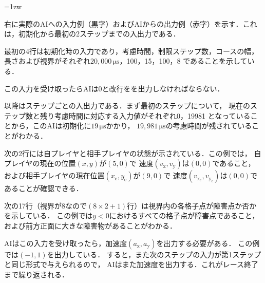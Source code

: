 \documentclass[11pt]{jarticle}
\begin{document}
\begin{minipage}[t]{.6\textwidth}

\parindent=1zw

右に実際のAIへの入力例（黒字）およびAIからの出力例（赤字）を示す．これは，初期化から最初の2ステップまでの入出力である．

最初の4行は初期化時の入力であり，考慮時間，制限ステップ数，コースの幅，
長さおよび視界がそれぞれ$20,000\,\si{\micro\second}$，100，15，100，8
であることを示している．

この入力を受け取ったらAIは0と改行をを出力しなければならない．

以降はステップごとの入出力である．まず最初のステップについて，
現在のステップ数と残り考慮時間に対応する入力値がそれぞれ0，19981
となっていることから，このAIは初期化に$19\,\si{\micro\second}$かかり，
$19,981\,\si{\micro\second}$の考慮時間が残されていることがわかる．

次の2行には自プレイヤと相手プレイヤの状態が示されている．この例では，
自プレイヤの現在の位置$(x,y)$が$(5,0)$で
速度$(v_\mathrm{x},v_\mathrm{y})$は$(0,0)$であること，
および相手プレイヤの現在位置$(x_\mathrm{e},y_\mathrm{e})$が$(9,0)$で
速度$(v_{\mathrm{x}_\mathrm{e}},v_{\mathrm{y}_\mathrm{e}})$は$(0,0)$であることが確認できる．

次の17行（視界が$8$なので$(8 \times 2 + 1)$行）は視界内の各格子点が障害点か否かを示している．
この例では$y < 0$におけるすべての格子点が障害点であること，
および前方正面に大きな障害物があることがわかる．

AIはこの入力を受け取ったら，加速度$(a_\mathrm{x}, a_\mathrm{y})$を出力する必要がある．
この例では$(-1, 1)$を出力している．
すると，また次のステップの入力が第1ステップと同じ形式で与えられるので，
AIはまた加速度を出力する．これがレース終了まで繰り返される．

\end{minipage}
\hfill
\end{document}
